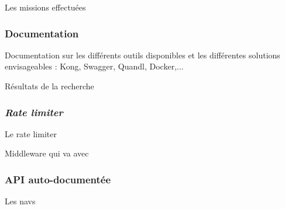 Les missions effectuées

\subsubsection{Documentation}
Documentation sur les différents outils disponibles et les différentes solutions envisageables : Kong, Swagger, Quandl, Docker,...

\vspace{3mm}

Résultats de la recherche


\subsubsection{\textit{Rate limiter}}
Le rate limiter

\vspace{3mm}

Middleware qui va avec


\subsubsection{API auto-documentée}
Les navs
